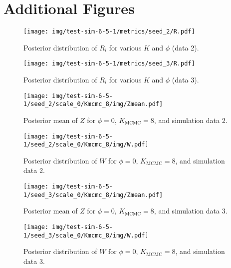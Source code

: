 \documentclass[12pt]{article} %
\begin{document}
\newpage

\section{Additional Figures}
\begin{figure}[h]
  \begin{center}
    \texttt{[image: img/test-sim-6-5-1/metrics/seed\_2/R.pdf]}
  \end{center}
  \caption{Posterior distribution of $R_i$ for various $K$ and $\phi$ (data 2).}
\end{figure}

\begin{figure}[h]
  \begin{center}
    \texttt{[image: img/test-sim-6-5-1/metrics/seed\_3/R.pdf]}
  \end{center}
  \caption{Posterior distribution of $R_i$ for various $K$ and $\phi$ (data 3).}
\end{figure}

\hrulefill \newpage

\begin{figure}[H]
  \begin{center}
    \texttt{[image: img/test-sim-6-5-1/seed\_2/scale\_0/Kmcmc\_8/img/Zmean.pdf]}
  \end{center}
  \caption{Posterior mean of $Z$ for $\phi=0$, $K_\text{MCMC}=8$, and
  simulation data 2.}
\end{figure}

\begin{figure}[H]
  \begin{center}
    \texttt{[image: img/test-sim-6-5-1/seed\_2/scale\_0/Kmcmc\_8/img/W.pdf]}
  \end{center}
  \caption{Posterior distribution of $W$ for $\phi=0$, $K_\text{MCMC}=8$, and
  simulation data 2.}
\end{figure}

\hrulefill \newpage

\begin{figure}[H]
  \begin{center}
    \texttt{[image: img/test-sim-6-5-1/seed\_3/scale\_0/Kmcmc\_8/img/Zmean.pdf]}
  \end{center}
  \caption{Posterior mean of $Z$ for $\phi=0$, $K_\text{MCMC}=8$, and
  simulation data 3.}
\end{figure}

\begin{figure}[H]
  \begin{center}
    \texttt{[image: img/test-sim-6-5-1/seed\_3/scale\_0/Kmcmc\_8/img/W.pdf]}
  \end{center}
  \caption{Posterior distribution of $W$ for $\phi=0$, $K_\text{MCMC}=8$, and
  simulation data 3.}
\end{figure}

\hrulefill \newpage
\end{document}
